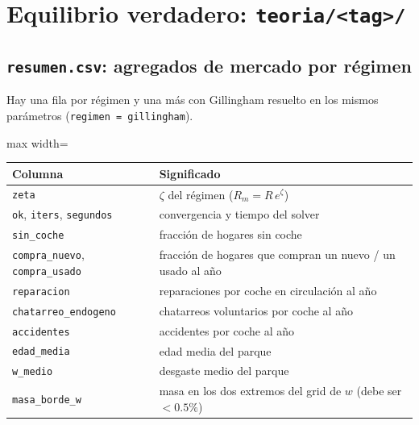 \documentclass[11pt]{article}
\newcommand{\col}[1]{\texttt{#1}}
\newcommand{\archivo}[1]{\textbf{\texttt{#1}}}
\begin{document}
\section{Equilibrio verdadero: \texttt{teoria/<tag>/}}

\subsection{\archivo{resumen.csv}: agregados de mercado por régimen}

Hay una fila por régimen y una más con Gillingham resuelto en los mismos parámetros
(\col{regimen = gillingham}).

\begin{center}\small
\begin{adjustbox}{max width=\textwidth}\begin{tabular}{ll}
\toprule
Columna & Significado\\
\midrule
\col{zeta} & $\zeta$ del régimen ($R_m=R\,e^{\zeta}$)\\
\col{ok}, \col{iters}, \col{segundos} & convergencia y tiempo del solver\\
\col{sin\_coche} & fracción de hogares sin coche\\
\col{compra\_nuevo}, \col{compra\_usado} & fracción de hogares que compran un nuevo / un usado al año\\
\col{reparacion} & reparaciones por coche en circulación al año\\
\col{chatarreo\_endogeno} & chatarreos voluntarios por coche al año\\
\col{accidentes} & accidentes por coche al año\\
\col{edad\_media} & edad media del parque\\
\col{w\_medio} & desgaste medio del parque\\
\col{masa\_borde\_w} & masa en los dos extremos del grid de $w$ (debe ser $<0.5\%$)\\
\bottomrule
\end{tabular}\end{adjustbox}
\end{center}
\end{document}
